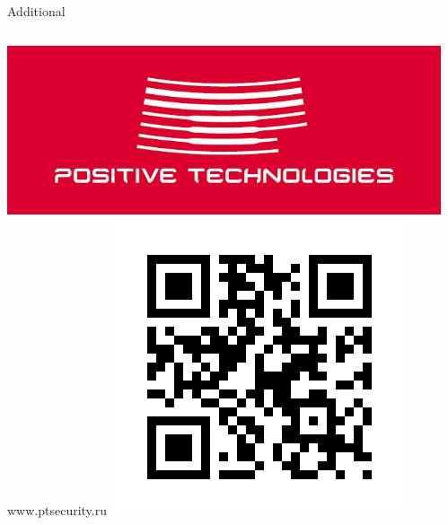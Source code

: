 \begin{frame}[fragile]{Additional}
    \tiny
    \begin{columns}[t] %
         \begin{column}[T]{5cm} %
            \begin{center}
              \includegraphics[width=\textwidth]{sources/images/positivetechnologies.jpg} \newline
              www.ptsecurity.ru \newline
              \includegraphics[width=\textwidth]{sources/images/positivetechnologies_qr.png}
            \end{center}
         \end{column}
         \begin{column}[T]{5cm} %

\end{column}
\end{columns}
\end{frame}
